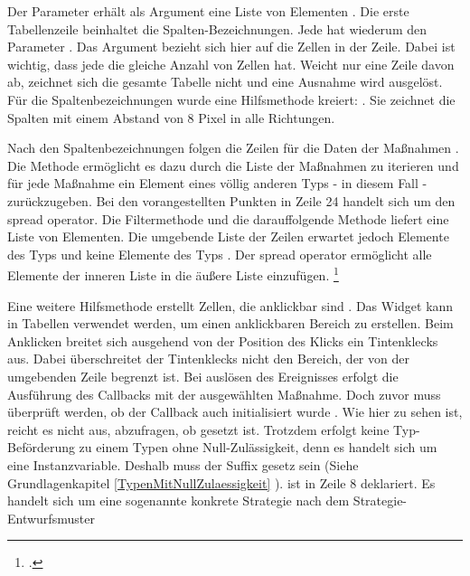 Der Parameter  erhält als Argument eine Liste von  Elementen . Die erste Tabellenzeile  beinhaltet die Spalten-Bezeichnungen. Jede  hat wiederum den Parameter . Das Argument bezieht sich hier auf die Zellen in der Zeile. Dabei ist wichtig, dass jede  die gleiche Anzahl von Zellen hat. Weicht nur eine Zeile davon ab, zeichnet sich die gesamte Tabelle nicht und eine Ausnahme wird ausgelöst. Für die Spaltenbezeichnungen wurde eine Hilfsmethode kreiert:  . Sie zeichnet die Spalten mit einem Abstand von 8 Pixel in alle Richtungen. 

Nach den Spaltenbezeichnungen folgen die Zeilen für die Daten der Maßnahmen . Die Methode   ermöglicht es dazu durch die Liste der Maßnahmen zu iterieren und für jede Maßnahme ein Element eines völlig anderen Typs - in diesem Fall  - zurückzugeben. Bei den vorangestellten Punkten  in Zeile 24 handelt sich um den spread operator. Die Filtermethode  und die darauffolgende Methode  liefert eine Liste von  Elementen. Die umgebende Liste der Zeilen   erwartet jedoch Elemente des Typs  und keine Elemente des Typs . Der spread operator ermöglicht alle Elemente der inneren Liste in die äußere Liste einzufügen. \footcite[Vgl.][]{SpreadOperator}

Eine weitere Hilfsmethode  erstellt Zellen, die anklickbar sind . Das Widget   kann in Tabellen verwendet werden, um einen anklickbaren Bereich zu erstellen. Beim  Anklicken breitet sich ausgehend von der Position des Klicks ein Tintenklecks  aus. Dabei überschreitet der Tintenklecks nicht den Bereich, der von der umgebenden Zeile begrenzt ist. Bei auslösen des Ereignisses  erfolgt die Ausführung des Callbacks   mit der ausgewählten Maßnahme. Doch zuvor muss überprüft werden, ob der Callback auch initialisiert wurde . Wie hier zu sehen ist, reicht es nicht aus, abzufragen, ob   gesetzt ist. Trotzdem erfolgt keine Typ-Beförderung zu einem Typen ohne Null-Zulässigkeit, denn es handelt sich um eine Instanzvariable. Deshalb muss der Suffix \IC{!} gesetz sein (Siehe Grundlagenkapitel \ref{TypenMitNullZulaessigkeit} ).  ist in Zeile 8 deklariert. Es handelt sich um eine sogenannte konkrete Strategie nach dem Strategie-Entwurfsmuster


